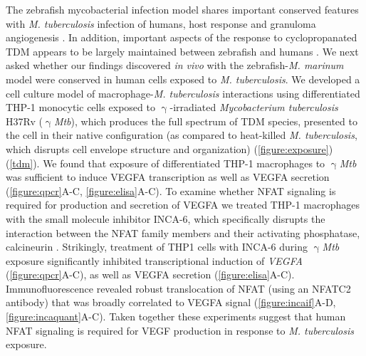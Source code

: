 The zebrafish mycobacterial infection model shares important conserved features with \textit{M. tuberculosis} infection of humans, host response and granuloma angiogenesis \citep{Swaim2006, Datta2015, Oehlers2015, Cronan2021}. In addition, important aspects of the response to cyclopropanated TDM appears to be largely maintained between zebrafish and humans \citep{Walton2018, Rao2005}. We next asked whether our findings discovered \textit{in vivo} with the zebrafish\hyp{}\textit{M. marinum} model were conserved in human cells exposed to \textit{M. tuberculosis}. We developed a cell culture model of macrophage\hyp{}\textit{M. tuberculosis} interactions using differentiated THP\hyp{}1 monocytic cells exposed to $\upgamma$\hyp{}irradiated \textit{Mycobacterium tuberculosis} H37Rv ($\upgamma$\textit{Mtb}), which produces the full spectrum of TDM species, presented to the cell in their native configuration (as compared to heat\hyp{}killed \textit{M. tuberculosis}, which disrupts cell envelope structure and organization) \citep{Romero2014, SecanellaFandos2014} (\autoref{figure:exposure}) (\autoref{tdm}). We found that exposure of differentiated THP\hyp{}1 macrophages to $\upgamma$\textit{Mtb} was sufficient to induce VEGFA transcription as well as VEGFA secretion (\autoref{figure:qpcr}A\hyp{}C, \autoref{figure:elisa}A\hyp{}C). To examine whether NFAT signaling is required for production and secretion of VEGFA we treated THP\hyp{}1 macrophages with the small molecule inhibitor INCA\hyp{}6, which specifically disrupts the interaction between the NFAT family members and their activating phosphatase, calcineurin \citep{Roehrl2004a, Roehrl2004b}. Strikingly, treatment of THP1 cells with INCA\hyp{}6 during $\upgamma$\textit{Mtb} exposure significantly inhibited transcriptional induction of \textit{VEGFA} (\autoref{figure:qpcr}A\hyp{}C), as well as VEGFA secretion (\autoref{figure:elisa}A\hyp{}C). Immunofluorescence revealed robust translocation of NFAT (using an NFATC2 antibody) that was broadly correlated to VEGFA signal (\autoref{figure:incaif}A\hyp{}D, \autoref{figure:incaquant}A\hyp{}C). Taken together these experiments suggest that human NFAT signaling is required for VEGF production in response to \textit{M. tuberculosis} exposure.

